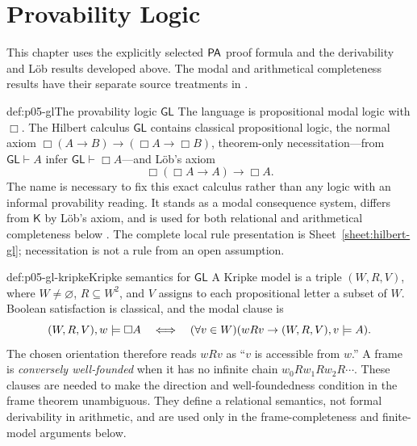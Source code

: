 \chapter{Provability Logic}\label{sec:p05-provability-logic}

This chapter uses the explicitly selected \(\mathsf{PA}\) proof formula and the
derivability and L\"ob results developed above. The modal and arithmetical
completeness results have their separate source treatments in
\cite{Segerberg1971,Solovay1976,Boolos1993}.

\begin{hbdefinition}{def:p05-gl}{The provability logic \(\mathsf{GL}\)}
The language is propositional modal logic with \(\Box\).  The Hilbert calculus
\(\mathsf{GL}\) contains classical propositional logic, the normal axiom
\(\Box(A\to B)\to(\Box A\to\Box B)\), theorem-only necessitation---from
\(\mathsf{GL}\vdash A\) infer \(\mathsf{GL}\vdash\Box A\)---and L\"ob's axiom
\[
 \Box(\Box A\to A)\to\Box A.
\]
The name is necessary to fix this exact calculus rather than any logic with an
informal provability reading.  It stands as a modal consequence system,
differs from \(\mathsf K\) by L\"ob's axiom, and is used for both relational
and arithmetical completeness below \cite{Segerberg1971,Boolos1993}.  The
complete local rule presentation is Sheet~\ref{sheet:hilbert-gl};
necessitation is not a rule from an open assumption.
\end{hbdefinition}

\begin{hbdefinition}{def:p05-gl-kripke}{Kripke semantics for \(\mathsf{GL}\)}
A Kripke model is a triple \((W,R,V)\), where \(W\ne\varnothing\),
\(R\subseteq W^2\), and \(V\) assigns to each propositional letter a subset
of \(W\).  Boolean satisfaction is classical, and the modal clause is
\[
 (W,R,V),w\models\Box A
 \quad\Longleftrightarrow\quad
 (\forall v\in W)(wRv\to(W,R,V),v\models A).
\]
The chosen orientation therefore reads \(wRv\) as “\(v\) is accessible from
\(w\).”  A frame is \emph{conversely well-founded} when it has no infinite
chain \(w_0Rw_1Rw_2R\cdots\).  These clauses are needed to make the direction
and well-foundedness condition in the frame theorem unambiguous.  They define
a relational semantics, not formal derivability in arithmetic, and are used
only in the frame-completeness and finite-model arguments below.
\end{hbdefinition}

